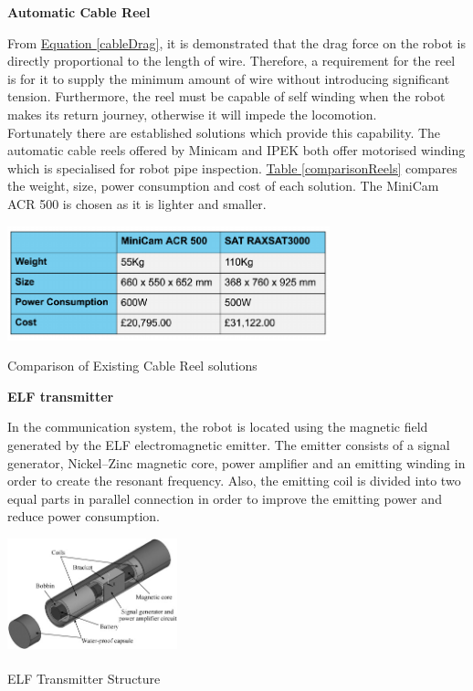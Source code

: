 \documentclass[11pt]{article}		%
\newcommand{\supercite}[1]{\textsuperscript{\cite{#1}}}		%
\newcommand{\equationref}[1]{\hyperref[#1]{Equation \ref*{#1}}}     %
\newcommand{\tableref}[1]{\hyperref[#1]{Table \ref*{#1}}}     %
\begin{document}
		    \textbf{Automatic Cable Reel}
	
	        From \equationref{cableDrag}, it is demonstrated that the drag force on the robot is directly proportional to the length of wire. 
	        Therefore, a requirement for the reel is for it to supply the minimum amount of wire without introducing significant tension. 
	        Furthermore, the reel must be capable of self winding when the robot makes its return journey, otherwise it will impede the locomotion.
	        \\ 
	        \hspace*{3ex}Fortunately there are established solutions which provide this capability. 
	        The automatic cable reels offered by Minicam and IPEK both offer motorised winding which is specialised for robot pipe inspection. 
	        \tableref{comparisonReels} compares the weight, size, power consumption and cost of each solution. 
	        The MiniCam ACR 500 is chosen as it is lighter and smaller. 
	
	     
	        \begin{table}[h]
				\centering
				\includegraphics[width=0.7\textwidth]{tablecables}
				\caption{Comparison of Existing Cable Reel solutions}
				\label{comparisonReels}
			\end{table}
	        
	        
	        \textbf{ELF transmitter}

	        In the communication system, the robot is located using the magnetic field generated by the ELF electromagnetic emitter. 
	        The emitter consists of a signal generator, Nickel–Zinc magnetic core, power amplifier and an emitting winding in order to create the resonant frequency. 
	        Also, the emitting coil is divided into two equal parts in parallel connection in order to improve the emitting power and reduce power consumption. 
       
	        \begin{floatingfigure}[r]{0.4\textwidth}
				\centering
				\includegraphics[width = 0.37\textwidth]{ELFtransmitter.jpg}
				\caption{ELF Transmitter Structure \supercite{ELFTransmitter}}
				\label{ELFtransmitter}
	        \end{floatingfigure}
\end{document}
